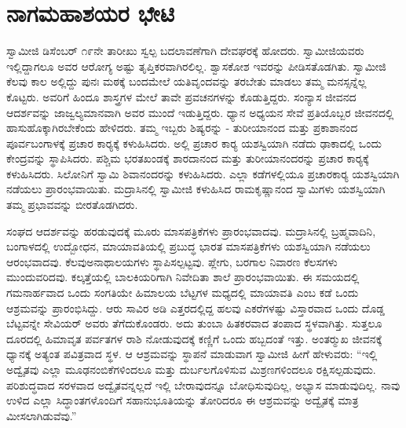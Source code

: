 
\chapter{ನಾಗಮಹಾಶಯರ ಭೇಟಿ }

\vskip 2pt

 ಸ್ವಾಮೀಜಿ ಡಿಸೆಂಬರ್ ೧೯ನೇ ತಾರೀಖು ಸ್ವಲ್ಪ ಬದಲಾವಣೆಗಾಗಿ ದೇವಘರಕ್ಕೆ ಹೋದರು. ಸ್ವಾಮೀಜಿಯವರು ಇಲ್ಲಿದ್ದಾಗಲೂ ಅವರ ಆರೋಗ್ಯ ಅಷ್ಟು ತೃಪ್ತಿಕರವಾಗಿರಲಿಲ್ಲ. ಶ್ವಾಸಕೋಶ ಇವರನ್ನು ಪೀಡಿಸತೊಡಗಿತು. ಸ್ವಾಮೀಜಿ ಕೆಲವು ಕಾಲ ಅಲ್ಲಿದ್ದು ಪುನಃ ಮಠಕ್ಕೆ ಬಂದಮೇಲೆ ಯತಿವೃಂದವನ್ನು ತರಬೇತು ಮಾಡಲು ತಮ್ಮ ಮನಸ್ಸನ್ನೆಲ್ಲ ಕೊಟ್ಟರು. ಅವರಿಗೆ ಹಿಂದೂ ಶಾಸ್ತ್ರಗಳ ಮೇಲೆ ತಾವೇ ಪ್ರವಚನಗಳನ್ನು ಕೊಡುತ್ತಿದ್ದರು. ಸಂನ್ಯಾಸ ಜೀವನದ ಆದರ್ಶವನ್ನು ಜಾಜ್ವಲ್ಯಮಾನವಾಗಿ ಅವರ ಮುಂದೆ ಇಡುತ್ತಿದ್ದರು. ಧ್ಯಾನ ಅಧ್ಯಯನ ಸೇವೆ ಪ್ರತಿಯೊಬ್ಬರ ಜೀವನದಲ್ಲಿ ಹಾಸುಹೊಕ್ಕಾಗಿರಬೇಕೆಂದು ಹೇಳಿದರು. ತಮ್ಮ ಇಬ್ಬರು ಶಿಷ್ಯರನ್ನು - ತುರೀಯಾನಂದ ಮತ್ತು ಪ್ರಕಾಶಾನಂದ ಪೂರ್ವಬಂಗಾಳಕ್ಕೆ ಪ್ರಚಾರ ಕಾರ‍್ಯಕ್ಕೆ ಕಳುಹಿಸಿದರು. ಅಲ್ಲಿ ಪ್ರಚಾರ ಕಾರ‍್ಯ ಯಶಸ್ವಿಯಾಗಿ ನಡೆದು ಢಾಕಾದಲ್ಲಿ ಒಂದು ಕೇಂದ್ರವನ್ನು ಸ್ಥಾಪಿಸಿದರು. ಪಶ್ಚಿಮ ಭರತಖಂಡಕ್ಕೆ ಶಾರದಾನಂದ ಮತ್ತು ತುರೀಯಾನಂದರನ್ನು ಪ್ರಚಾರ ಕಾರ‍್ಯಕ್ಕೆ ಕಳುಹಿಸಿದರು. ಸಿಲೋನಿಗೆ ಸ್ವಾಮಿ ಶಿವಾನಂದರನ್ನು ಕಳುಹಿಸಿದರು. ಎಲ್ಲಾ ಕಡೆಗಳಲ್ಲಿಯೂ ಪ್ರಚಾರಕಾರ‍್ಯ ಯಶಸ್ವಿಯಾಗಿ ನಡೆಯಲು ಪ್ರಾರಂಭವಾಯಿತು. ಮದ್ರಾಸಿನಲ್ಲಿ ಸ್ವಾಮೀಜಿ ಕಳುಹಿಸಿದ ರಾಮಕೃಷ್ಣಾನಂದ ಸ್ವಾಮಿಗಳು ಯಶಸ್ವಿಯಾಗಿ ತಮ್ಮ ಪ್ರಭಾವವನ್ನು ಬೀರತೊಡಗಿದರು. 

\vskip 2pt

 ಸಂಘದ ಆದರ್ಶವನ್ನು ಹರಡುವುದಕ್ಕೆ ಮೂರು ಮಾಸಪತ್ರಿಕೆಗಳು ಪ್ರಾರಂಭವಾದವು. ಮದ್ರಾಸಿನಲ್ಲಿ ಬ್ರಹ್ಮವಾದಿನಿ, ಬಂಗಾಳದಲ್ಲಿ ಉದ್ಬೋಧನ, ಮಾಯಾವತಿಯಲ್ಲಿ ಪ್ರಬುದ್ಧ ಭಾರತ ಮಾಸಪತ್ರಿಕೆಗಳು ಯಶಸ್ವಿಯಾಗಿ ನಡೆಯಲು ಆರಂಭವಾದವು. ಕೆಲವು\break ಅನಾಥಾಲಯಗಳು ಸ್ಥಾಪಿಸಲ್ಪಟ್ಟವು. ಪ್ಲೇಗು, ಬರಗಾಲ ನಿವಾರಣ ಕೆಲಸಗಳು ಮುಂದುವರಿದವು. ಕಲ್ಕತ್ತೆಯಲ್ಲಿ ಬಾಲಕಿಯರಿಗಾಗಿ ನಿವೇದಿತಾ ಶಾಲೆ ಪ್ರಾರಂಭವಾಯಿತು. ಈ ಸಮಯದಲ್ಲಿ ಗಮನಾರ್ಹವಾದ ಒಂದು ಸಂಗತಿಯೇ ಹಿಮಾಲಯ ಬೆಟ್ಟಗಳ ಮಧ್ಯದಲ್ಲಿ ಮಾಯಾವತಿ ಎಂಬ ಕಡೆ ಒಂದು ಆಶ್ರಮವನ್ನು ಪ್ರಾರಂಭಿಸಿದ್ದು. ಆರು ಸಾವಿರ ಅಡಿ ಎತ್ತರದಲ್ಲಿದ್ದ ಹಲವು ಎಕರೆಗಳಷ್ಟು ವಿಸ್ತಾರವಾದ ಒಂದು ದೊಡ್ಡ ಬೆಟ್ಟವನ್ನೇ ಸೇವಿಯರ್ ಅವರು ತೆಗೆದುಕೊಂಡರು. ಅದು ತುಂಬಾ ಹಿತಕರವಾದ ತಂಪಾದ ಸ್ಥಳವಾಗಿತ್ತು. ಸುತ್ತಲೂ ದೂರದಲ್ಲಿ ಹಿಮಾವೃತ ಪರ್ವತಗಳ ರಾಶಿ ನೋಡುವುದಕ್ಕೆ ಕಣ್ಣಿಗೆ ಒಂದು ಹಬ್ಬದಂತೆ ಇತ್ತು. ಅಂತರ‍್ಮುಖ ಜೀವನಕ್ಕೆ ಧ್ಯಾನಕ್ಕೆ ಅತ್ಯಂತ ಪವಿತ್ರವಾದ ಸ್ಥಳ. ಆ ಆಶ್ರಮವನ್ನು ಸ್ಥಾಪನೆ ಮಾಡುವಾಗ ಸ್ವಾಮೀಜಿ ಹೀಗೆ ಹೇಳುವರು: “ಇಲ್ಲಿ ಅದ್ವೈತವು ಎಲ್ಲಾ ಮೂಢನಂಬಿಕೆಗಳಿಂದಲೂ ಮತ್ತು ದುರ್ಬಲಗೊಳಿಸುವ ಮಿಶ್ರಣಗಳಿಂದಲೂ ರಕ್ಷಿಸಲ್ಪಡುವುದು. ಪರಿಶುದ್ಧವಾದ ಸರಳವಾದ ಅದ್ವೈತವನ್ನಲ್ಲದೆ ಇಲ್ಲಿ ಬೇರಾವುದನ್ನೂ ಬೋಧಿಸುವುದಿಲ್ಲ, ಅಭ್ಯಾಸ ಮಾಡುವುದಿಲ್ಲ. ನಾವು ಉಳಿದ ಎಲ್ಲಾ ಸಿದ್ಧಾಂತಗಳೊಂದಿಗೆ ಸಹಾನುಭೂತಿಯನ್ನು ತೋರಿದರೂ ಈ ಆಶ್ರಮವನ್ನು ಅದ್ವೈತಕ್ಕೆ ಮಾತ್ರ ಮೀಸಲಾಗಿಡುವೆವು.” 

\vskip 2pt

